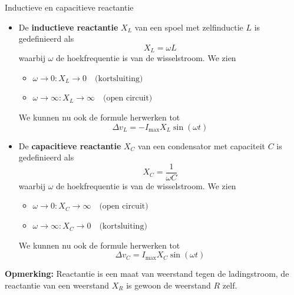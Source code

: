 \begin{theo}{Inductieve en capacitieve reactantie}
    \begin{itemize}
        \item   
        De \textbf{inductieve reactantie} $X_{L}$ van een spoel met zelfinductie $L$ is gedefinieerd als
        \begin{equation*}
            X_{L} = \omega L
        \end{equation*}
        waarbij $\omega$ de hoekfrequentie is van de wisselstroom. We zien 
        \begin{itemize}
            \item $ \omega \to 0: X_{L} \to 0 \quad \text{(kortsluiting)} $
            \item $ \omega \to \infty: X_{L} \to \infty \quad \text{(open circuit)} $
        \end{itemize}
        We kunnen nu ook de formule herwerken tot
        \begin{equation*}
            \Delta v_{L} = -I_{\max}X_{L}\sin(\omega t)
        \end{equation*}

        \item    
        De \textbf{capacitieve reactantie} $X_{C}$ van een condensator met capaciteit $C$ is gedefinieerd als
        \begin{equation*}
            X_{C} = \dfrac{1}{\omega C}
        \end{equation*}
        waarbij $\omega$ de hoekfrequentie is van de wisselstroom. We zien
        \begin{itemize}
            \item $ \omega \to 0: X_{C} \to \infty \quad \text{(open circuit)} $
            \item $ \omega \to \infty: X_{C} \to 0 \quad \text{(kortsluiting)}$
        \end{itemize}
            We kunnen nu ook de formule herwerken tot
        \begin{equation*}
            \Delta v_{C} = I_{\max}X_{C}\sin(\omega t)
        \end{equation*}
        
    \end{itemize}
    \vspace{0.3cm}
    \noindent \textbf{Opmerking:} Reactantie is een maat van weerstand tegen de ladingstroom, de reactantie van een weerstand $X_{R}$ is gewoon de weerstand $R$ zelf.
\end{theo}

